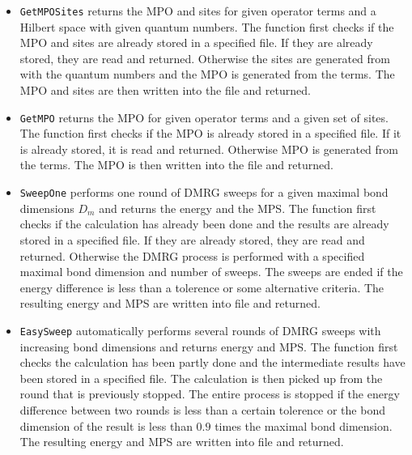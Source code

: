 \documentclass{timesjhep}
\begin{document}
\begin{itemize}
    \item \lstinline|GetMPOSites| returns the MPO and sites for given operator terms and a Hilbert space with given quantum numbers. The function first checks if the MPO and sites are already stored in a specified file. If they are already stored, they are read and returned. Otherwise the sites are generated from with the quantum numbers and the MPO is generated from the terms. The MPO and sites are then written into the file and returned. 
    \item \lstinline|GetMPO| returns the MPO for given operator terms and a given set of sites. The function first checks if the MPO is already stored in a specified file. If it is already stored, it is read and returned. Otherwise MPO is generated from the terms. The MPO is then written into the file and returned. 
    \item \lstinline|SweepOne| performs one round of DMRG sweeps for a given maximal bond dimensions $D_m$ and returns the energy and the MPS. The function first checks if the calculation has already been done and the results are already stored in a specified file. If they are already stored, they are read and returned. Otherwise the DMRG process is performed with a specified maximal bond dimension and number of sweeps. The sweeps are ended if the energy difference is less than a tolerence or some alternative criteria. The resulting energy and MPS are written into file and returned.
    \item \lstinline|EasySweep| automatically performs several rounds of DMRG sweeps with increasing bond dimensions and returns energy and MPS. The function first checks the calculation has been partly done and the intermediate results have been stored in a specified file. The calculation is then picked up from the round that is previously stopped. The entire process is stopped if the energy difference between two rounds is less than a certain tolerence or the bond dimension of the result is less than $0.9$ times the maximal bond dimension. The resulting energy and MPS are written into file and returned.
\end{itemize}
\end{document}
